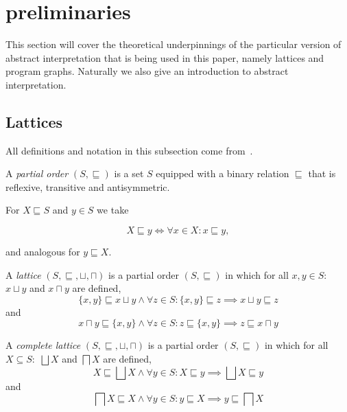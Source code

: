 
\section{preliminaries}\label{sec:preliminaries}
This section will cover the theoretical underpinnings of the particular version of abstract interpretation that is being used in this paper, namely lattices and program graphs.
Naturally we also give an introduction to abstract interpretation.

\subsection{Lattices}\label{subsec:lattices}
All definitions and notation in this subsection come from~\cite{nielson_formal_2019}.


\begin{definition}
    A \emph{partial order} $(S, \sqsubseteq)$ is a set $S$ equipped with a binary relation $\sqsubseteq$ that is reflexive, transitive and antisymmetric.
\end{definition}


For $X \sqsubseteq S$ and $y \in S$ we take


\begin{equation}
    X \sqsubseteq y \iff \forall x \in X : x \sqsubseteq y,\label{eq:equation}
\end{equation}


and analogous for $y \sqsubseteq X$.


\begin{definition}
    A \emph{lattice} $(S, \sqsubseteq, \sqcup, \sqcap)$ is a partial order $(S, \sqsubseteq)$ in which for all $x,y \in S:$ $x \sqcup y$ and $x \sqcap y$ are defined,
    \begin{equation}
        \{x, y\} \sqsubseteq x \sqcup y \land \forall z \in S : \{x, y\} \sqsubseteq z \implies x \sqcup y \sqsubseteq z\label{eq:equation4}
    \end{equation}
    and
    \begin{equation}
        x \sqcap y \sqsubseteq \{x, y\} \land \forall z \in S : z \sqsubseteq \{x, y\} \implies z \sqsubseteq x \sqcap y\label{eq:equation5}
    \end{equation}
\end{definition}


\begin{definition}
    A \emph{complete lattice} $(S, \sqsubseteq, \sqcup, \sqcap)$ is a partial order $(S, \sqsubseteq)$ in which for all $X \subseteq S:$ $\bigsqcup X$ and $\bigsqcap X$ are defined,
    \begin{equation}
        X \sqsubseteq \bigsqcup X \land \forall y \in S : X \sqsubseteq y \implies \bigsqcup X \sqsubseteq y\label{eq:equation2}
    \end{equation}
    and
    \begin{equation}
        \bigsqcap X \sqsubseteq X \land \forall y \in S : y \sqsubseteq X \implies y \sqsubseteq \bigsqcap X\label{eq:equation3}
    \end{equation}
\end{definition}


